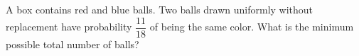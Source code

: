 A box contains red and blue balls. Two balls drawn uniformly without replacement have probability $\dfrac{11}{18}$ of being the same color. What is the minimum possible total number of balls?
